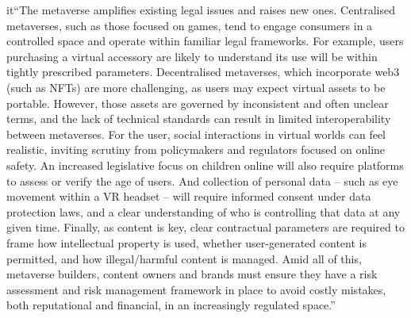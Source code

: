 it{``The metaverse amplifies existing legal issues and raises new ones. Centralised metaverses, such as those focused on games, tend to engage consumers in a controlled space and operate within familiar legal frameworks. For example, users purchasing a virtual accessory are likely to understand its use will be within tightly prescribed
parameters. Decentralised metaverses, which incorporate web3 (such as NFTs) are more challenging, as users may expect virtual assets to be portable. However, those assets are governed by inconsistent and often unclear terms, and the lack of technical standards can result in limited interoperability between metaverses. For the user, social interactions in virtual worlds can feel realistic, inviting scrutiny from policymakers and regulators focused on online
safety. An increased legislative focus on children online will also require platforms to assess or verify the age of users. And collection of personal data – such as eye movement within a VR headset – will require informed consent under data protection laws, and a clear understanding of who is controlling that data at any given time.
Finally, as content is key, clear contractual parameters are required to frame how intellectual property is used, whether user-generated content is permitted, and how illegal/harmful content is managed.
Amid all of this, metaverse builders, content owners and brands must ensure they have a risk assessment and risk management framework
in place to avoid costly mistakes, both reputational and financial, in an increasingly regulated space.''}\par

